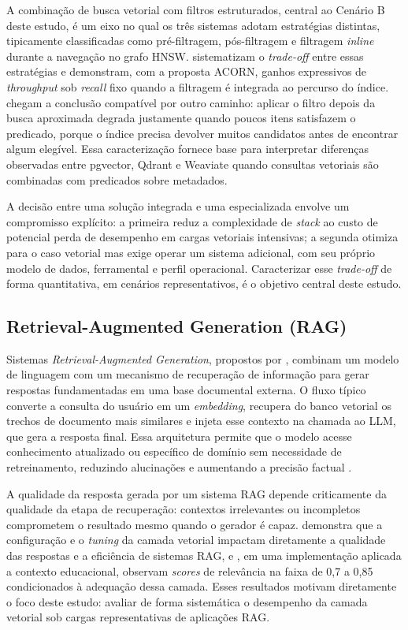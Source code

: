 A combinação de busca vetorial com filtros estruturados, central ao Cenário B deste estudo, é um eixo no qual os três sistemas adotam estratégias distintas, tipicamente classificadas como pré-filtragem, pós-filtragem e filtragem \textit{inline} durante a navegação no grafo HNSW.  sistematizam o \textit{trade-off} entre essas estratégias e demonstram, com a proposta ACORN, ganhos expressivos de \textit{throughput} sob \textit{recall} fixo quando a filtragem é integrada ao percurso do índice.  chegam a conclusão compatível por outro caminho: aplicar o filtro depois da busca aproximada degrada justamente quando poucos itens satisfazem o predicado, porque o índice precisa devolver muitos candidatos antes de encontrar algum elegível. Essa caracterização fornece base para interpretar diferenças observadas entre pgvector, Qdrant e Weaviate quando consultas vetoriais são combinadas com predicados sobre metadados.

A decisão entre uma solução integrada e uma especializada envolve um compromisso explícito: a primeira reduz a complexidade de \textit{stack} ao custo de potencial perda de desempenho em cargas vetoriais intensivas; a segunda otimiza para o caso vetorial mas exige operar um sistema adicional, com seu próprio modelo de dados, ferramental e perfil operacional. Caracterizar esse \textit{trade-off} de forma quantitativa, em cenários representativos, é o objetivo central deste estudo.

\subsection{Retrieval-Augmented Generation (RAG)}

Sistemas \textit{Retrieval-Augmented Generation}, propostos por , combinam um modelo de linguagem com um mecanismo de recuperação de informação para gerar respostas fundamentadas em uma base documental externa. O fluxo típico converte a consulta do usuário em um \textit{embedding}, recupera do banco vetorial os trechos de documento mais similares e injeta esse contexto na chamada ao LLM, que gera a resposta final. Essa arquitetura permite que o modelo acesse conhecimento atualizado ou específico de domínio sem necessidade de retreinamento, reduzindo alucinações e aumentando a precisão factual \cite{jing2024llmvdb}.

A qualidade da resposta gerada por um sistema RAG depende criticamente da qualidade da etapa de recuperação: contextos irrelevantes ou incompletos comprometem o resultado mesmo quando o gerador é capaz.  demonstra que a configuração e o \textit{tuning} da camada vetorial impactam diretamente a qualidade das respostas e a eficiência de sistemas RAG, e , em uma implementação aplicada a contexto educacional, observam \textit{scores} de relevância na faixa de 0,7 a 0,85 condicionados à adequação dessa camada. Esses resultados motivam diretamente o foco deste estudo: avaliar de forma sistemática o desempenho da camada vetorial sob cargas representativas de aplicações RAG.

